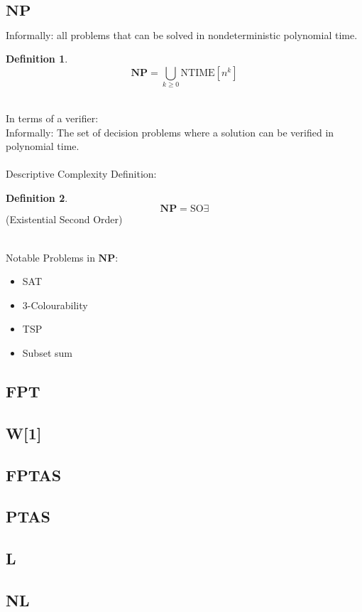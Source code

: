 \documentclass[]{article}
\theoremstyle{definition}
\newtheorem{definition}{Definition}[section]
\begin{document}
\subsection{$\mathbf{NP}$}
\label{sec:NP}
Informally: all problems that can be solved in nondeterministic polynomial time.
\begin{definition}
	$$\mathbf{NP} = \bigcup_{k\geq 0} \hyperref[sec:NTIME]{\text{NTIME}}[n^{k}]$$
\end{definition}
$ $
\\
\\
In terms of a verifier:
\\
Informally: The set of decision problems where a solution can be verified in polynomial time.
\\
\\
Descriptive Complexity Definition:
\begin{definition}
	$$\mathbf{NP} = \text{SO}\exists$$
	(Existential Second Order)
\end{definition}
$ $
\\
\\
Notable Problems in $\mathbf{NP}$:
\begin{itemize}
	\item SAT
	\item 3-Colourability
	\item TSP
	\item Subset sum
\end{itemize}
\subsection{FPT}

\subsection{W[1]}

\subsection{FPTAS}

\subsection{PTAS}

\subsection{L}

\subsection{NL}
\end{document}
